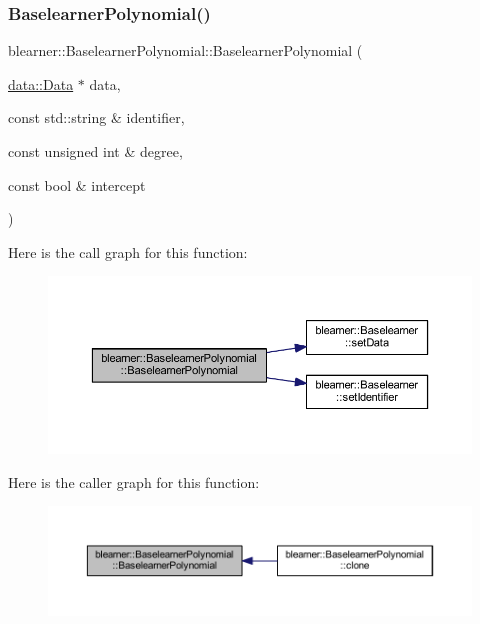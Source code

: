 \subsubsection{\texorpdfstring{Baselearner\+Polynomial()}{BaselearnerPolynomial()}}
{\footnotesize\ttfamily blearner\+::\+Baselearner\+Polynomial\+::\+Baselearner\+Polynomial (\begin{DoxyParamCaption}\item[{\hyperlink{classdata_1_1_data}{data\+::\+Data} $\ast$}]{data,  }\item[{const std\+::string \&}]{identifier,  }\item[{const unsigned int \&}]{degree,  }\item[{const bool \&}]{intercept }\end{DoxyParamCaption})}

Here is the call graph for this function\+:\nopagebreak
\begin{figure}[H]
\begin{center}
\leavevmode
\includegraphics[width=350pt]{classblearner_1_1_baselearner_polynomial_aba0f1e5bf9566dc7bc674c9d30b44af6_cgraph}
\end{center}
\end{figure}
Here is the caller graph for this function\+:\nopagebreak
\begin{figure}[H]
\begin{center}
\leavevmode
\includegraphics[width=350pt]{classblearner_1_1_baselearner_polynomial_aba0f1e5bf9566dc7bc674c9d30b44af6_icgraph}
\end{center}
\end{figure}
\mbox{\label{classblearner_1_1_baselearner_polynomial_abb799eceb2808fcca4c8041e2ae7abe4}} 
